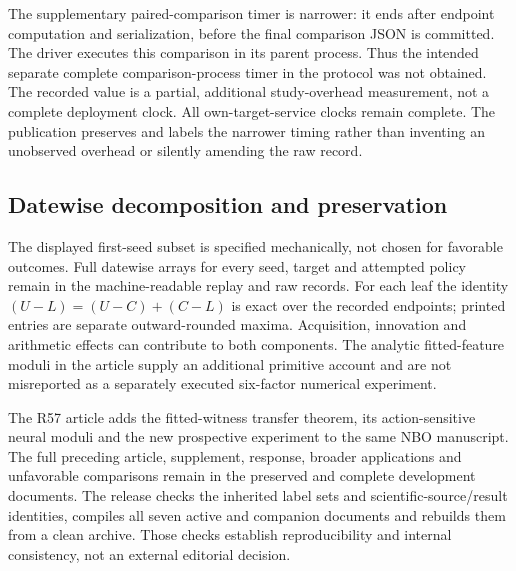 The supplementary paired-comparison timer is narrower: it ends after endpoint computation and serialization, before the final comparison JSON is committed. The driver executes this comparison in its parent process. Thus the intended separate complete comparison-process timer in the protocol was not obtained. The recorded value is a partial, additional study-overhead measurement, not a complete deployment clock. All own-target-service clocks remain complete. The publication preserves and labels the narrower timing rather than inventing an unobserved overhead or silently amending the raw record.

\subsection{Datewise decomposition and preservation}

The displayed first-seed subset is specified mechanically, not chosen for favorable outcomes. Full datewise arrays for every seed, target and attempted policy remain in the machine-readable replay and raw records. For each leaf the identity $(U-L)=(U-C)+(C-L)$ is exact over the recorded endpoints; printed entries are separate outward-rounded maxima. Acquisition, innovation and arithmetic effects can contribute to both components. The analytic fitted-feature moduli in the article supply an additional primitive account and are not misreported as a separately executed six-factor numerical experiment.

The R57 article adds the fitted-witness transfer theorem, its action-sensitive neural moduli and the new prospective experiment to the same NBO manuscript. The full preceding article, supplement, response, broader applications and unfavorable comparisons remain in the preserved and complete development documents. The release checks the inherited label sets and scientific-source/result identities, compiles all seven active and companion documents and rebuilds them from a clean archive. Those checks establish reproducibility and internal consistency, not an external editorial decision.
